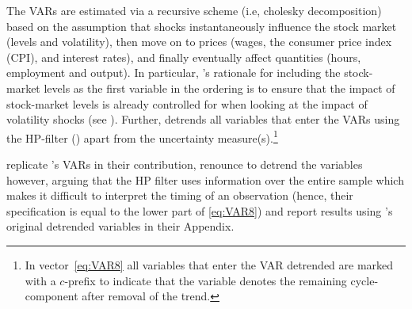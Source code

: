 \documentclass[a4paper,11pt,listof=nochaptergap,oneside,pointednumbers,bibtotoc,bigheadings,liststotoc,hidelinks]{scrbook}
\theoremstyle{mysatz}
\theoremstyle{mydefinition}
\theoremstyle{mytheorem}
\theoremstyle{mybemerkung}
\begin{document}
The VARs are estimated via a recursive scheme (i.e, cholesky decomposition) based on the assumption that shocks instantaneously influence the stock market (levels and volatility), then move on to prices (wages, the consumer price index (CPI), and interest rates), and finally eventually affect quantities (hours, employment and output). In particular, \citet{bloom:09}'s rationale for including the stock-market levels as the first variable in the ordering is to ensure that the impact of stock-market levels is already controlled for when looking at the impact of volatility shocks (see \citealp[p. 630]{bloom:09}). Further, \citet{bloom:09} detrends all variables that enter the VARs using the HP-filter (\citealp{hodrickandprescott:97}) apart from the uncertainty measure(s).\footnote{In vector~\ref{eq:VAR8} all variables that enter the VAR detrended are marked with a $c$-prefix to indicate that the variable denotes the remaining cycle-component after removal of the trend.}

\citet{juradoetal:15} replicate \citet{bloom:09}'s VARs in their contribution, renounce to detrend the variables however, arguing that the HP filter uses information over the entire sample which makes it difficult to interpret the timing of an observation (hence, their specification is equal to the lower part of \ref{eq:VAR8}) and report results using \citet{bloom:09}'s original detrended variables in their Appendix.
\end{document}
